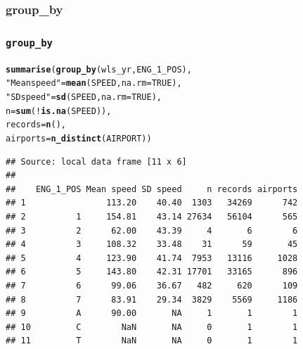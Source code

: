 \documentclass{beamer}\usepackage[]{graphicx}\usepackage[]{color}
\makeatletter
\newcommand{\hlnum}[1]{\textcolor[rgb]{0.686,0.059,0.569}{#1}}%
\newcommand{\hlstr}[1]{\textcolor[rgb]{0.192,0.494,0.8}{#1}}%
\newcommand{\hlopt}[1]{\textcolor[rgb]{0,0,0}{#1}}%
\newcommand{\hlstd}[1]{\textcolor[rgb]{0.345,0.345,0.345}{#1}}%
\newcommand{\hlkwc}[1]{\textcolor[rgb]{0.333,0.667,0.333}{#1}}%
\newcommand{\hlkwd}[1]{\textcolor[rgb]{0.737,0.353,0.396}{\textbf{#1}}}%
\newenvironment{kframe}{%
 \def\at@end@of@kframe{}%
 \ifinner\ifhmode%
  \def\at@end@of@kframe{\end{minipage}}%
  \begin{minipage}{\columnwidth}%
 \fi\fi%
 \def\FrameCommand##1{\hskip\@totalleftmargin \hskip-\fboxsep
 \colorbox{shadecolor}{##1}\hskip-\fboxsep
     \hskip-\linewidth \hskip-\@totalleftmargin \hskip\columnwidth}%
 \MakeFramed {\advance\hsize-\width
   \@totalleftmargin\z@ \linewidth\hsize
   \@setminipage}}%
 {\par\unskip\endMakeFramed%
 \at@end@of@kframe}
\newenvironment{knitrout}{}{} %
\makeatother
\begin{document}
\subsubsection{group\_by}%
\begin{frame}[fragile]
  \frametitle{{\tt group\_by}}
\begin{knitrout}\footnotesize
{}\color{fgcolor}\begin{kframe}
\begin{alltt}
\hlkwd{summarise}\hlstd{(}\hlkwd{group_by}\hlstd{(wls_yr, ENG_1_POS),}
          \hlstr{"Mean speed"} \hlstd{=} \hlkwd{mean}\hlstd{(SPEED,} \hlkwc{na.rm} \hlstd{=} \hlnum{TRUE}\hlstd{),}
          \hlstr{"SD speed"}   \hlstd{=} \hlkwd{sd}\hlstd{(SPEED,} \hlkwc{na.rm} \hlstd{=} \hlnum{TRUE}\hlstd{),}
          \hlkwc{n}            \hlstd{=} \hlkwd{sum}\hlstd{(}\hlopt{!}\hlkwd{is.na}\hlstd{(SPEED)),}
          \hlkwc{records}      \hlstd{=} \hlkwd{n}\hlstd{(),}
          \hlkwc{airports}     \hlstd{=} \hlkwd{n_distinct}\hlstd{(AIRPORT))}
\end{alltt}
\begin{verbatim}
## Source: local data frame [11 x 6]
## 
##    ENG_1_POS Mean speed SD speed     n records airports
## 1                113.20    40.40  1303   34269      742
## 2          1     154.81    43.14 27634   56104      565
## 3          2      62.00    43.39     4       6        6
## 4          3     108.32    33.48    31      59       45
## 5          4     123.90    41.74  7953   13116     1028
## 6          5     143.80    42.31 17701   33165      896
## 7          6      99.06    36.67   482     620      109
## 8          7      83.91    29.34  3829    5569     1186
## 9          A      90.00       NA     1       1        1
## 10         C        NaN       NA     0       1        1
## 11         T        NaN       NA     0       1        1
\end{verbatim}
\end{kframe}
\end{knitrout}
\end{frame} 
\end{document}
